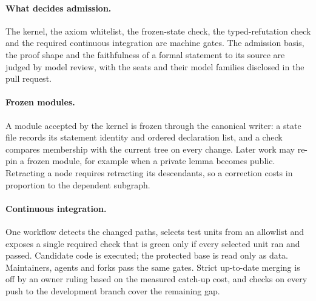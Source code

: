 \documentclass[11pt]{article}
\begin{document}
\paragraph{What decides admission.} The kernel, the axiom whitelist, the
frozen-state check, the typed-refutation check and the required continuous
integration are machine gates. The admission basis, the proof shape and the
faithfulness of a formal statement to its source are judged by model review,
with the seats and their model families disclosed in the pull request.

\paragraph{Frozen modules.} A module accepted by the kernel is frozen through
the canonical writer: a state file records its statement identity and ordered
declaration list, and a check compares membership with the current tree on
every change. Later work may re-pin a frozen module, for example when a
private lemma becomes public. Retracting a node requires retracting its
descendants, so a correction costs in proportion to the dependent subgraph.

\paragraph{Continuous integration.} One workflow detects the changed paths,
selects test units from an allowlist and exposes a single required check that
is green only if every selected unit ran and passed. Candidate code is
executed; the protected base is read only as data. Maintainers, agents and
forks pass the same gates. Strict up-to-date merging is off by an owner
ruling based on the measured catch-up cost, and checks on every push to the
development branch cover the remaining gap.
\end{document}
